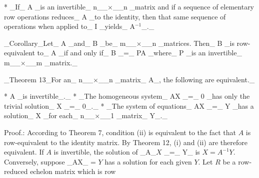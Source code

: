 * _If_ A _is an invertible_ n__\(\times\)__n _matrix and if a sequence of elementary row operations reduces_ A _to the identity, then that same sequence of operations when applied to_ I _yields_ A\({}^{-1}\)_._

_Corollary_Let_ A _and_ B _be_ m__\(\times\)__n _matrices. Then_ B _is row-equivalent to_ A _if and only if_ B _=_ PA _where_ P _is an invertible_ m__\(\times\)__m _matrix._

_Theorem 13_For an_ n__\(\times\)__n _matrix_ A_, the following are equivalent._

* A _is invertible_._
* _The homogeneous system_ A\(\mathrm{X}\) _=_ 0 _has only the trivial solution_ X _=_ 0_._
* _The system of equations_ A\(\mathrm{X}\) _=_ Y _has a solution_ X _for each_ n__\(\times\)__1 _matrix_ Y_._

Proof.: According to Theorem 7, condition (ii) is equivalent to the fact that \(A\) is row-equivalent to the identity matrix. By Theorem 12, (i) and (ii) are therefore equivalent. If \(A\) is invertible, the solution of _A_\(X\) _=_ Y_ is \(X=A^{-1}Y\). Conversely, suppose _AX_ = \(Y\) has a solution for each given \(Y\). Let \(R\) be a row-reduced echelon matrix which is row 